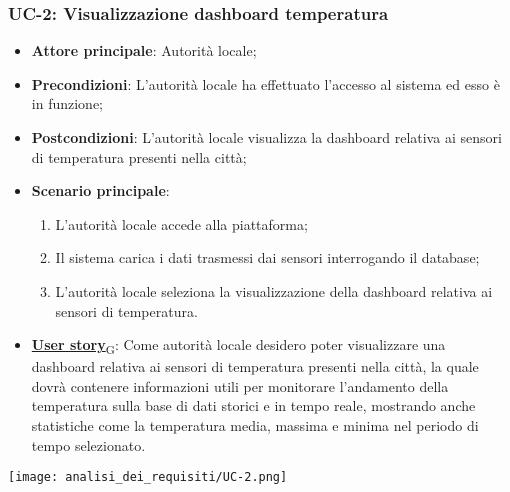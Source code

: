 \subsubsection{UC-2: Visualizzazione dashboard temperatura}
\begin{itemize}
	\item \textbf{Attore principale}: Autorità locale;
	\item \textbf{Precondizioni}: L'autorità locale ha effettuato l'accesso al sistema ed esso è in funzione;
	\item \textbf{Postcondizioni}: L'autorità locale visualizza la dashboard relativa
	      ai sensori di temperatura presenti nella città;
	\item \textbf{Scenario principale}:
	      \begin{enumerate}
		      \item L'autorità locale accede alla piattaforma;
		      \item Il sistema carica i dati trasmessi dai sensori interrogando il database;
		      \item L'autorità locale seleziona la visualizzazione della dashboard relativa ai sensori di temperatura.
	      \end{enumerate}
	\item \href{https://7last.github.io/docs/rtb/documentazione-interna/glossario\#user-story}{\textbf{User story}\textsubscript{G}}:
	      Come autorità locale desidero poter visualizzare una dashboard relativa ai sensori di temperatura presenti nella città, la quale
	      dovrà contenere informazioni utili per monitorare l'andamento della temperatura sulla base di dati storici e in tempo reale, mostrando
	      anche statistiche come la temperatura media, massima e minima nel periodo di tempo selezionato.
\end{itemize}
\begin{center}
	\texttt{[image: analisi\_dei\_requisiti/UC-2.png]}
\end{center}

